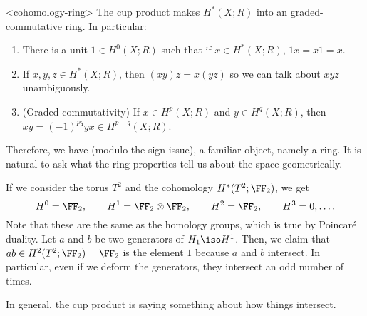 \documentclass{standalone}
\begin{document}
\begin{theorem}<cohomology-ring>
  The cup product makes \(H^*(X; R)\) into an graded-commutative ring.
  In particular:
  \begin{enumerate}[nosep]
    \item There is a unit \(1 \in H^0(X; R)\) such that
      if \(x \in H^*(X; R)\), \(1x = x1 = x\).
    \item If \(x, y, z \in H^*(X; R)\), then \((xy)z = x(yz)\)
      so we can talk about \(xyz\) unambiguously.
    \item (Graded-commutativity)
      If \(x \in H^p(X; R)\) and \(y \in H^q(X; R)\), then
      \(xy = (-1)^{pq} yx \in H^{p+q}(X; R)\).
  \end{enumerate}
\end{theorem}

Therefore, we have (modulo the sign issue),
a familiar object, namely a ring.
It is natural to ask what the ring properties tell us
about the space geometrically.


\begin{example}
  If we consider the torus \(T^2\) and the cohomology \(H^*(T^2; \FF_2)\),
  we get
  \[
    H^0 = \FF_2, \qquad
    H^1 = \FF_2 \otimes \FF_2, \qquad
    H^2 = \FF_2, \qquad
    H^3 = 0, \ldots.
  \]
  Note that these are the same as the homology groups,
  which is true by Poincar\'e duality.
  Let \(a\) and \(b\) be two generators of \(H_1 \iso H^1\).
  Then, we claim that \(ab \in H^2(T^2; \FF_2) = \FF_2\)
  is the element \(1\) because \(a\) and \(b\) intersect.
  In particular, even if we deform the generators,
  they intersect an odd number of times.

  In general, the cup product is saying something about how things intersect.
\end{example}
\end{document}
